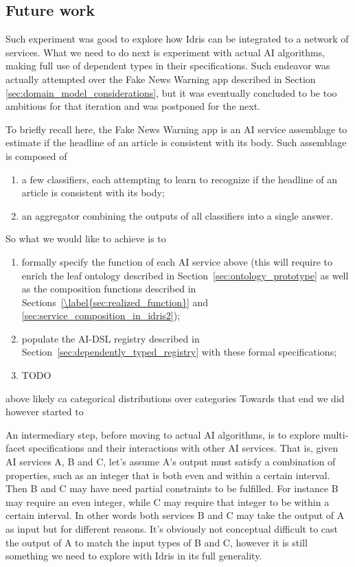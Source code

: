 \documentclass[]{report}
\begin{document}
\subsection{Future work}
\label{sec:net_ai_future_work}
Such experiment was good to explore how Idris can be integrated to a
network of services.  What we need to do next is experiment with
actual AI algorithms, making full use of dependent types in their
specifications.  Such endeavor was actually attempted over the Fake
News Warning app described in Section
\ref{sec:domain_model_considerations}, but it was eventually concluded
to be too ambitious for that iteration and was postponed for the next.

To briefly recall here, the Fake News Warning app is an AI service
assemblage to estimate if the headline of an article is consistent
with its body.  Such assemblage is composed of
\begin{enumerate}
\item a few classifiers, each attempting to learn to recognize if the
  headline of an article is consistent with its body;
\item an aggregator combining the outputs of all classifiers into a
  single answer.
\end{enumerate}
So what we would like to achieve is to
\begin{enumerate}
\item formally specify the function of each AI service above (this
  will require to enrich the leaf ontology described in
  Section~\ref{sec:ontology_prototype} as well as the composition
  functions described in Sections~\ref{\label{sec:realized_function}}
  and \ref{sec:service_composition_in_idris2});
\item populate the AI-DSL registry described in
  Section~\ref{sec:dependently_typed_registry} with these formal
  specifications;
\item TODO
\end{enumerate}

 above likely ca categorical distributions over categories Towards
 that end we did however started to

An intermediary step, before moving to actual AI algorithms, is to
explore multi-facet specifications and their interactions with other
AI services.  That is, given AI services A, B and C, let's assume A's
output must satisfy a combination of properties, such as an integer
that is both even and within a certain interval.  Then B and C may
have need partial constraints to be fulfilled.  For instance B may
require an even integer, while C may require that integer to be within
a certain interval.  In other words both services B and C may take the
output of A as input but for different reasons.  It's obviously not
conceptual difficult to cast the output of A to match the input types
of B and C, however it is still something we need to explore with
Idris in its full generality.
\end{document}
